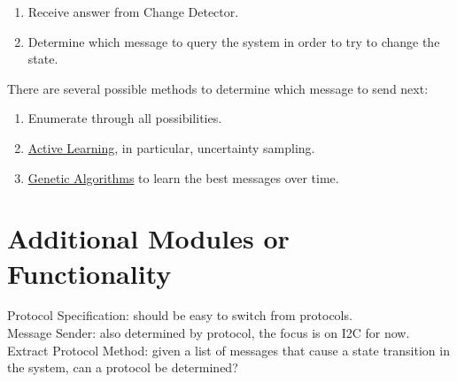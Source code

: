 \documentclass[11pt, a4paper]{article}
\begin{document}
\begin{enumerate}
    \item Receive answer from Change Detector.
    \item Determine which message to query the system in order to try to change the state.
\end{enumerate}

There are several possible methods to determine which message to send next:
\begin{enumerate}
    \item Enumerate through all possibilities.
    \item \href{https://en.wikipedia.org/wiki/Active_learning_(machine_learning)}{Active Learning}, in particular, uncertainty sampling.
    \item \href{https://en.wikipedia.org/wiki/Genetic_algorithm}{Genetic Algorithms} to learn the best messages over time.
\end{enumerate}

\section*{Additional Modules or Functionality}
Protocol Specification: should be easy to switch from protocols. \\
Message Sender: also determined by protocol, the focus is on I2C for now.\\
Extract Protocol Method: given a list of messages that cause a state transition in the system, can a protocol be determined?
\end{document}
